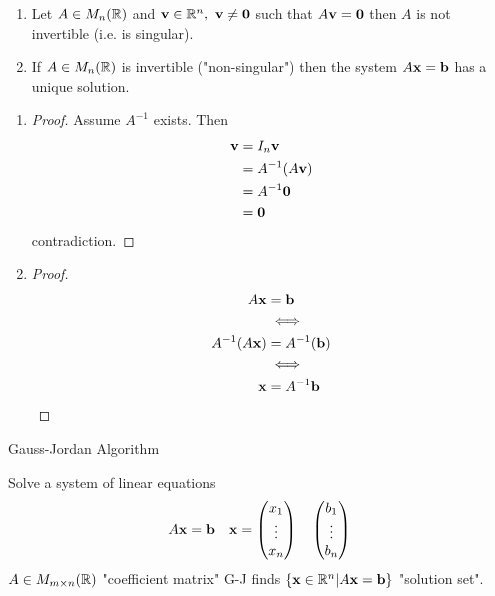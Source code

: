 \documentclass[10pt, a4paper]{article}
\begin{document}
\begin{lemma}\phantom{}
    \begin{enumerate}[label = (\roman*)]
        \item Let $A \in M_n(\mathbb{R})$ and $\mathbf{v} \in \mathbb{R} ^ n,\ \mathbf{v} \neq \mathbf{0}$ such that $A\mathbf{v} = \mathbf{0}$ then $A$ is not invertible (i.e. is singular).
        \item If $A \in M_n(\mathbb{R})$ is invertible ("non-singular") then the system $A\mathbf{x} = \mathbf{b}$ has a unique solution.
    \end{enumerate}
    \begin{enumerate}[label = (\roman*)]
        \item
        \begin{proof}
            Assume $A ^ {-1}$ exists. Then
            \begin{align*}
                \mathbf{v} &= I_n \mathbf{v} \\
                &= A ^ {-1}(A\mathbf{v}) \\
                &= A ^ {-1}\mathbf{0} \\
                &= \mathbf{0}
            \end{align*}
            contradiction.
        \end{proof}
        \item
        \begin{proof}
            \begin{align*}
                A\mathbf{x} &= \mathbf{b} \\
                &\iff \\
                A ^ {-1}(A\mathbf{x}) &= A ^ {-1}(\mathbf{b}) \\
                &\iff \\
                \mathbf{x} &= A ^ {-1}\mathbf{b}
            \end{align*}
        \end{proof}
    \end{enumerate}
\end{lemma}

Gauss-Jordan Algorithm

Solve a system of linear equations
\[
A\mathbf{x} = \mathbf{b}\quad\mathbf{x} = \begin{pmatrix}
    x_1 \\ \vdots \\ x_n
\end{pmatrix}
\quad
\begin{pmatrix}
    b_1 \\ \vdots \\ b_n
\end{pmatrix}
\]
$A \in M_{m \times n}(\mathbb{R})$ "coefficient matrix"
G-J finds $\{\mathbf{x} \in \mathbb{R} ^ n | A\mathbf{x} = \mathbf{b}\}$ "solution set".
\end{document}
